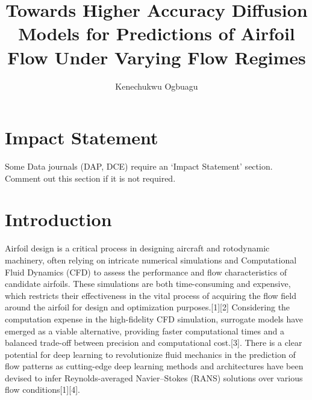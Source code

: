 \documentclass{CUP-JNL-DTM}%
\theoremstyle{definition}
\numberwithin{equation}{section}
\begin{document}
\begin{Frontmatter}

\title[Article Title]{Towards Higher Accuracy Diffusion Models for Predictions of Airfoil Flow Under Varying Flow Regimes}

\author[1]{Kenechukwu Ogbuagu}


\address[1]{, , }




\end{Frontmatter}

\section*{Impact Statement}
Some Data journals (DAP, DCE) require an `Impact Statement' section. Comment out this section if it is not required.


\section[Introduction]{Introduction}
Airfoil design is a critical process in designing aircraft and rotodynamic machinery, often relying on intricate numerical simulations and Computational Fluid Dynamics (CFD) to assess the performance and flow characteristics of candidate airfoils. These simulations are both time-consuming and expensive, which restricts their effectiveness in the vital process of acquiring the flow field around the airfoil for design and optimization purposes.[1][2] Considering the computation expense in the high-fidelity CFD simulation, surrogate models have emerged as a viable alternative, providing faster computational times and a balanced trade-off between precision and computational cost.[3]. 
There is a clear potential for deep learning to revolutionize fluid mechanics in the prediction of flow patterns as cutting-edge deep learning methods and architectures have been devised to infer Reynolds-averaged Navier–Stokes (RANS) solutions over various flow conditions[1][4].
\end{document}
